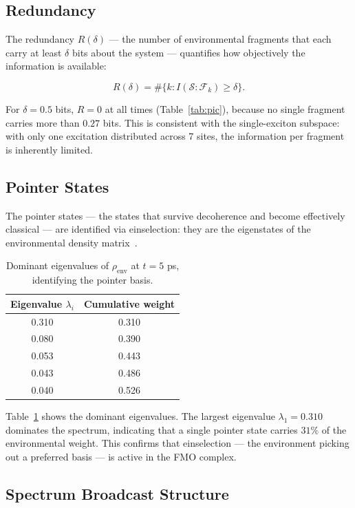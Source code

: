 \documentclass[aps,njp,twocolumn,showpacs,superscriptaddress]{revtex4-2}
\begin{document}
\subsection{Redundancy}

The redundancy $R(\delta)$ --- the number of environmental fragments that each carry at least $\delta$ bits about the system --- quantifies how objectively the information is available:

\[
R(\delta) = \#\{k : I(\mathcal{S} : \mathcal{F}_k) \geq \delta\}.
\]

For $\delta = 0.5$ bits, $R = 0$ at all times (Table~\ref{tab:pic}), because no single fragment carries more than $0.27$ bits. This is consistent with the single-exciton subspace: with only one excitation distributed across 7 sites, the information per fragment is inherently limited.

\subsection{Pointer States}

The pointer states --- the states that survive decoherence and become effectively classical --- are identified via einselection: they are the eigenstates of the environmental density matrix~\cite{Zurek2003}.

\begin{table}[htbp]
\caption{Dominant eigenvalues of $\rho_{\mathrm{env}}$ at $t = 5$ ps, identifying the pointer basis.}
\label{tab:pointer}
\centering
\begin{tabular}{cc}
\toprule
Eigenvalue $\lambda_i$ & Cumulative weight \\
\midrule
0.310 & 0.310 \\
0.080 & 0.390 \\
0.053 & 0.443 \\
0.043 & 0.486 \\
0.040 & 0.526 \\
\bottomrule
\end{tabular}
\end{table}

Table~\ref{tab:pointer} shows the dominant eigenvalues. The largest eigenvalue $\lambda_1 = 0.310$ dominates the spectrum, indicating that a single pointer state carries $31\%$ of the environmental weight. This confirms that einselection --- the environment picking out a preferred basis --- is active in the FMO complex.

\subsection{Spectrum Broadcast Structure}
\end{document}
